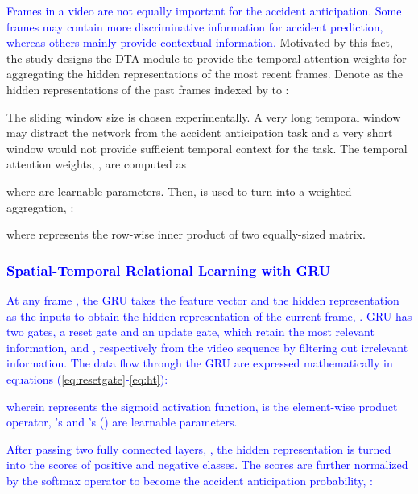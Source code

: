 \documentclass[journal]{IEEEtran}
\begin{document}
\textcolor{blue}{
Frames in a video are not equally important for the accident anticipation. Some frames may contain more discriminative information for accident prediction, whereas others mainly provide contextual information.} Motivated by this fact, the study designs the DTA module to provide the temporal attention weights for aggregating the hidden representations of the most recent  frames.
Denote  as the hidden representations of the past  frames indexed by  to : 

The sliding window size  is chosen experimentally. A very long temporal window may distract the network from the accident anticipation task and a very short window would not provide sufficient temporal context for the task. The temporal attention weights,  , are computed as

where  are learnable parameters. Then,  is used to turn  into a weighted aggregation, :

where  represents the row-wise inner product of two equally-sized matrix. 


\subsubsection{\textcolor{blue}{Spatial-Temporal Relational Learning with GRU}}

\textcolor{blue}{At any frame , the GRU takes the feature vector  and the hidden representation  as the inputs to obtain the hidden representation of the current frame, . GRU has two gates, a reset gate and an update gate, which retain the most relevant information,  and , respectively from the video sequence by filtering out irrelevant information. The data flow through the GRU are expressed mathematically in equations (\ref{eq:resetgate}-\ref{eq:ht}):
}
 
\vspace{-1em}

\vspace{-1em}
 
\vspace{-1em}

\textcolor{blue}{wherein  represents the sigmoid activation function,  is the element-wise product operator, 's and 's () are learnable parameters.}

\textcolor{blue}{After passing two fully connected layers, , the hidden representation  is turned into the scores of 
positive and negative classes. The scores are further normalized by the softmax operator to become the accident anticipation probability, :}
\end{document}
